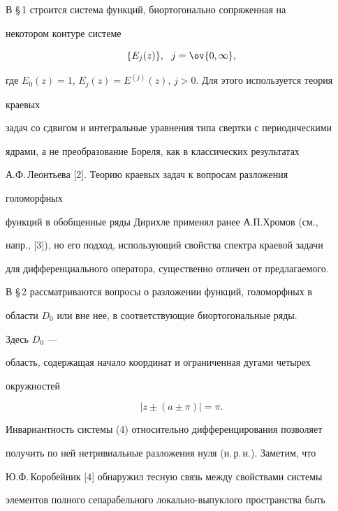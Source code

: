  


В \S\,1 строится система функций, биортогонально сопряженная на  


некотором контуре системе 


\begin{equation} 


\{E_j(z)\},\ \ j=\ov{0,\infty}, 


\end{equation} 


где $E_0(z)=1$, $E_j(z)=E^{(j)}(z)$, $j>0$. Для этого используется теория 


краевых 


задач со сдвигом и интегральные уравнения типа свертки с периодическими  


ядрами, а не преобразование Бореля, как в классических результатах  


А.Ф.\,Леонтьева [2]. Теорию краевых задач к вопросам разложения 


голоморфных  


функций в обобщенные ряды Дирихле применял ранее А.П.Хромов (см.,  


напр., [3]), но его подход, использующий свойства спектра краевой задачи  


для дифференциального оператора, существенно отличен от предлагаемого. 


 


В \S\,2 рассматриваются вопросы о разложении функций, голоморфных в 


области $D_0$ или вне нее, в соответствующие биортогональные ряды. 


Здесь $D_0$ --- 


область, содержащая начало координат и ограниченная дугами четырех 


окружностей 


\begin{equation} 


|z\pm(a\pm\pi)|=\pi. 


\end{equation} 


Инвариантность системы (4) относительно дифференцирования позволяет  


получить по ней нетривиальные разложения нуля (н.\,р.\,н.). Заметим, что  


Ю.Ф.\,Коробейник [4] обнаружил тесную связь между свойствами системы  


элементов полного сепарабельного локально-выпуклого пространства быть  


